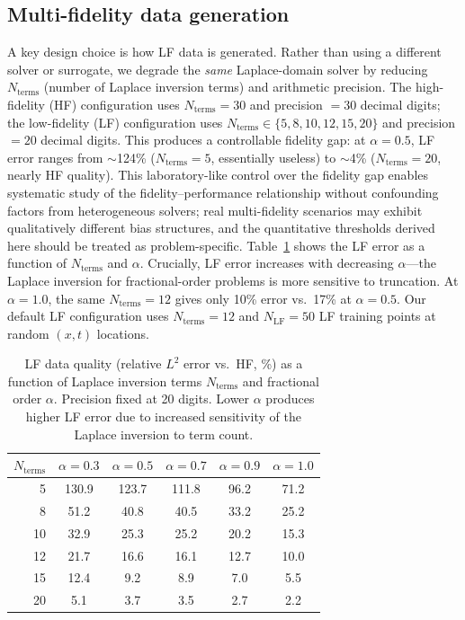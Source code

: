 \documentclass[11pt]{article}
\newcommand{\NLF}{N_{\mathrm{LF}}}
\begin{document}
\subsection{Multi-fidelity data generation}
\label{sec:mf_data}

A key design choice is how LF data is generated. Rather than using a different solver or surrogate, we degrade the \emph{same} Laplace-domain solver by reducing $N_{\mathrm{terms}}$ (number of Laplace inversion terms) and arithmetic precision. The high-fidelity (HF) configuration uses $N_{\mathrm{terms}} = 30$ and precision $= 30$ decimal digits; the low-fidelity (LF) configuration uses $N_{\mathrm{terms}} \in \{5, 8, 10, 12, 15, 20\}$ and precision $= 20$ decimal digits. This produces a controllable fidelity gap: at $\alpha = 0.5$, LF error ranges from $\sim$124\% ($N_{\mathrm{terms}} = 5$, essentially useless) to $\sim$4\% ($N_{\mathrm{terms}} = 20$, nearly HF quality). This laboratory-like control over the fidelity gap enables systematic study of the fidelity--performance relationship without confounding factors from heterogeneous solvers; real multi-fidelity scenarios may exhibit qualitatively different bias structures, and the quantitative thresholds derived here should be treated as problem-specific. Table~\ref{tab:lf_quality} shows the LF error as a function of $N_{\mathrm{terms}}$ and $\alpha$. Crucially, LF error increases with decreasing $\alpha$---the Laplace inversion for fractional-order problems is more sensitive to truncation. At $\alpha = 1.0$, the same $N_{\mathrm{terms}} = 12$ gives only 10\% error vs.\ 17\% at $\alpha = 0.5$. Our default LF configuration uses $N_{\mathrm{terms}} = 12$ and $\NLF = 50$ LF training points at random $(x, t)$ locations.

\begin{table}[t]
\centering
\caption{LF data quality (relative $L^2$ error vs.\ HF, \%) as a function of Laplace inversion terms $N_{\mathrm{terms}}$ and fractional order $\alpha$. Precision fixed at 20 digits. Lower $\alpha$ produces higher LF error due to increased sensitivity of the Laplace inversion to term count.}
\label{tab:lf_quality}
\begin{tabular}{rccccc}
\toprule
$N_{\mathrm{terms}}$ & $\alpha = 0.3$ & $\alpha = 0.5$ & $\alpha = 0.7$ & $\alpha = 0.9$ & $\alpha = 1.0$ \\
\midrule
5 & 130.9 & 123.7 & 111.8 & 96.2 & 71.2 \\
8 & 51.2 & 40.8 & 40.5 & 33.2 & 25.2 \\
10 & 32.9 & 25.3 & 25.2 & 20.2 & 15.3 \\
12 & 21.7 & 16.6 & 16.1 & 12.7 & 10.0 \\
15 & 12.4 & 9.2 & 8.9 & 7.0 & 5.5 \\
20 & 5.1 & 3.7 & 3.5 & 2.7 & 2.2 \\
\bottomrule
\end{tabular}
\end{table}
\end{document}
